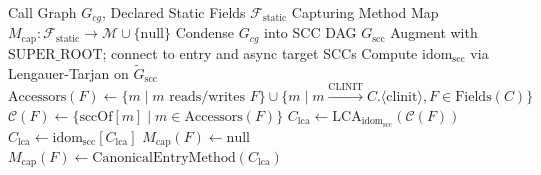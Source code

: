 \documentclass[12pt,a4paper]{article}
\newcommand{\sccOf}{\text{sccOf}}
\newcommand{\idom}{\text{idom}}
\begin{document}
\begin{algorithm}[H]
\caption{Static Scoping for Static Field Lifetime Bounding}
\label{alg:static-scoping}
\begin{algorithmic}[1]
\Require Call Graph $G_{cg}$, Declared Static Fields $\mathcal{F}_{\text{static}}$
\Ensure Capturing Method Map $M_{\text{cap}} : \mathcal{F}_{\text{static}} \to \mathcal{M} \cup \{\text{null}\}$
\State Condense $G_{cg}$ into SCC DAG $G_{\text{scc}}$
\State Augment with $\text{SUPER\_ROOT}$; connect to entry and async target SCCs
\State Compute $\idom_{\text{scc}}$ via Lengauer-Tarjan on $\widetilde{G}_{\text{scc}}$
  \State $\text{Accessors}(F) \gets \{m \mid m \text{ reads/writes } F\} \cup \{m \mid m \xrightarrow{\text{CLINIT}} C.\langle\text{clinit}\rangle, F \in \text{Fields}(C)\}$
  \State $\mathcal{C}(F) \gets \{\sccOf[m] \mid m \in \text{Accessors}(F)\}$
  \State $C_{\text{lca}} \gets \text{LCA}_{\idom_{\text{scc}}}(\mathcal{C}(F))$
    \State $C_{\text{lca}} \gets \idom_{\text{scc}}[C_{\text{lca}}]$ 
  \EndWhile
    \State $M_{\text{cap}}(F) \gets \text{null}$ 
  \Else
    \State $M_{\text{cap}}(F) \gets \text{CanonicalEntryMethod}(C_{\text{lca}})$
  \EndIf
\EndFor
\end{algorithmic}
\end{algorithm}
\end{document}
